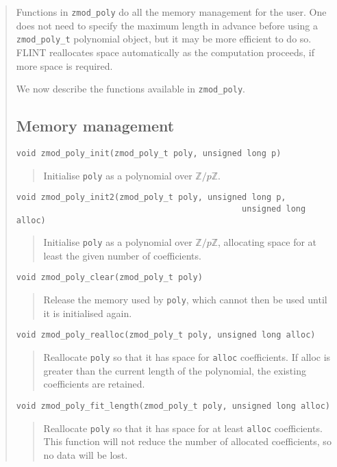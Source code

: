 \documentclass[a4paper,10pt]{article}
\newcommand{\Z}{\mathbb{Z}}
\newcommand{\code}{\lstinline}
\begin{document}
\begin{quote}
Functions in \code{zmod_poly} do all the memory management for the user. One does not need to specify the maximum length in advance before using a \code{zmod_poly_t} polynomial object, but it may be more efficient to do so. FLINT reallocates space automatically as the computation proceeds, if more space is required. 

We now describe the functions available in \code{zmod_poly}.

\subsection{Memory management}

\begin{lstlisting}
void zmod_poly_init(zmod_poly_t poly, unsigned long p)
\end{lstlisting}
\begin{quote}
Initialise \code{poly} as a polynomial over $\Z/p\Z$. 
\end{quote}

\begin{lstlisting}
void zmod_poly_init2(zmod_poly_t poly, unsigned long p, 
                                              unsigned long alloc)
\end{lstlisting}
\begin{quote}
Initialise \code{poly} as a polynomial over $\Z/p\Z$, allocating space for at least the given number of coefficients. 
\end{quote}

\begin{lstlisting}
void zmod_poly_clear(zmod_poly_t poly)
\end{lstlisting}
\begin{quote}
Release the memory used by \code{poly}, which cannot then be used until it is initialised again.
\end{quote}

\begin{lstlisting}
void zmod_poly_realloc(zmod_poly_t poly, unsigned long alloc)
\end{lstlisting}
\begin{quote}
Reallocate \code{poly} so that it has space for \code{alloc} coefficients. If alloc is greater than the current length of the polynomial, the existing coefficients are retained.
\end{quote}

\begin{lstlisting}
void zmod_poly_fit_length(zmod_poly_t poly, unsigned long alloc)
\end{lstlisting}
\begin{quote}
Reallocate \code{poly} so that it has space for at least \code{alloc} coefficients. This function will not reduce the number of allocated coefficients, so no data will be lost.
\end{quote}


\end{quote}
\end{document}

